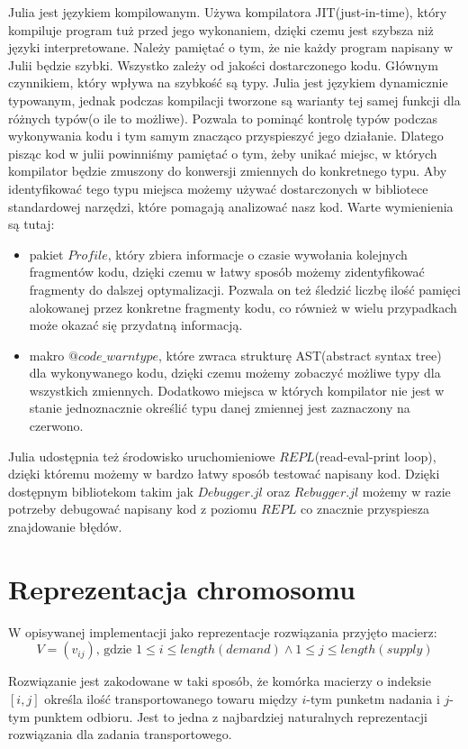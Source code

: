 Julia jest językiem kompilowanym. Używa kompilatora JIT(just-in-time), który kompiluje program tuż przed jego wykonaniem, dzięki czemu jest szybsza 
niż języki interpretowane. Należy pamiętać o tym, że nie każdy program napisany w Julii będzie szybki. Wszystko zależy od jakości dostarczonego kodu.
Głównym czynnikiem, który wpływa na szybkość są typy. Julia jest językiem dynamicznie typowanym, jednak podczas kompilacji tworzone są warianty tej samej 
funkcji dla różnych typów(o ile to możliwe). Pozwala to pominąć kontrolę typów podczas wykonywania kodu i tym samym znacząco przyspieszyć jego działanie.
Dlatego pisząc kod w julii powinniśmy pamiętać o tym, żeby unikać miejsc, w których kompilator będzie zmuszony do konwersji zmiennych do konkretnego typu. 
Aby identyfikować tego typu miejsca możemy używać dostarczonych w bibliotece standardowej narzędzi, które pomagają analizować nasz kod. 
Warte wymienienia są tutaj:
\begin{itemize}
    \item pakiet $Profile$, który zbiera informacje o czasie wywołania kolejnych fragmentów kodu, dzięki czemu w łatwy sposób 
    możemy zidentyfikować fragmenty do dalszej optymalizacji. Pozwala on też śledzić liczbę ilość pamięci alokowanej przez konkretne fragmenty 
    kodu, co również w wielu przypadkach może okazać się przydatną informacją.
    \item makro $@code\_warntype$, które zwraca strukturę AST(abstract syntax tree) dla wykonywanego kodu, dzięki czemu możemy zobaczyć możliwe typy dla wszystkich zmiennych. 
    Dodatkowo miejsca w których kompilator nie jest w stanie jednoznacznie określić typu danej zmiennej jest zaznaczony na czerwono.
\end{itemize}

Julia udostępnia też środowisko uruchomieniowe $REPL$(read-eval-print loop), dzięki któremu możemy w bardzo łatwy sposób testować napisany kod. 
Dzięki dostępnym bibliotekom takim jak $Debugger.jl$ oraz $Rebugger.jl$ możemy w razie potrzeby debugować napisany kod z poziomu $REPL$ co 
znacznie przyspiesza znajdowanie błędów.


\section{Reprezentacja chromosomu}
W opisywanej implementacji jako reprezentacje rozwiązania przyjęto macierz:
$$V = (v_{ij}) \text{, gdzie } 1 \le i \le length(demand) \land 1 \le j \le length(supply)$$

Rozwiązanie jest zakodowane w taki sposób, że komórka macierzy o indeksie $[i, j]$ określa ilość transportowanego towaru 
między $i$-tym punketm nadania i $j$-tym punktem odbioru. Jest to jedna z najbardziej naturalnych reprezentacji rozwiązania 
dla zadania transportowego.

